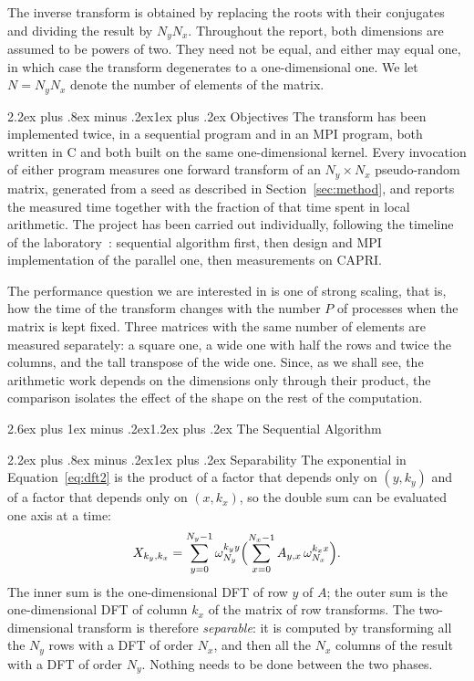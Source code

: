 \documentclass[conference,onecolumn]{IEEEtran}
\makeatletter
\renewcommand{\section}{\@startsection{section}{1}{\z@}%
  {2.6ex plus 1ex minus .2ex}{1.2ex plus .2ex}%
  {\normalfont\large\bfseries}}
\renewcommand{\subsection}{\@startsection{subsection}{2}{\z@}%
  {2.2ex plus .8ex minus .2ex}{1ex plus .2ex}%
  {\normalfont\normalsize\bfseries}}
\theoremstyle{course}
\makeatother
\begin{document}
The inverse transform is obtained by replacing the roots with their
conjugates and dividing the result by $N_yN_x$. Throughout the report, both
dimensions are assumed to be powers of two. They need not be equal, and
either may equal one, in which case the transform degenerates to a
one-dimensional one. We let $N=N_yN_x$ denote the number of elements of the
matrix.

\subsection{Objectives}
The transform has been implemented twice, in a sequential program and in an
MPI program, both written in C and both built on the same one-dimensional
kernel. Every invocation of either program measures one forward transform
of an $N_y\times N_x$ pseudo-random matrix, generated from a seed as
described in Section~\ref{sec:method}, and reports the measured time
together with the fraction of that time spent in local arithmetic. The
project has been carried out individually, following the timeline of the
laboratory~\cite{lab}: sequential algorithm first, then design and MPI
implementation of the parallel one, then measurements on CAPRI.

The performance question we are interested in is one of strong scaling,
that is, how the time of the transform changes with the number $P$ of
processes when the matrix is kept fixed. Three matrices with the same number
of elements are measured separately: a square one, a wide one with half the
rows and twice the columns, and the tall transpose of the wide one. Since,
as we shall see, the arithmetic work depends on the dimensions only through
their product, the comparison isolates the effect of the shape on the rest
of the computation.

\section{The Sequential Algorithm}\label{sec:seq}

\subsection{Separability}\label{sec:sep}
The exponential in Equation~\ref{eq:dft2} is the product of a factor that
depends only on $(y,k_y)$ and of a factor that depends only on $(x,k_x)$,
so the double sum can be evaluated one axis at a time:
\[
 X_{k_y,k_x}=\sum_{y=0}^{N_y-1}\omega_{N_y}^{k_y y}
 \Bigl(\sum_{x=0}^{N_x-1}A_{y,x}\,\omega_{N_x}^{k_x x}\Bigr).
\]
The inner sum is the one-dimensional DFT of row $y$ of $A$; the outer sum
is the one-dimensional DFT of column $k_x$ of the matrix of row transforms.
The two-dimensional transform is therefore \emph{separable}: it is computed
by transforming all the $N_y$ rows with a DFT of order $N_x$, and then all
the $N_x$ columns of the result with a DFT of order $N_y$. Nothing needs to
be done between the two phases.
\end{document}

